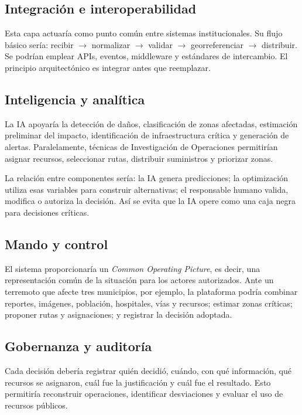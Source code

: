 \documentclass[11pt,a4paper]{article}
\begin{document}
\subsection{Integración e interoperabilidad}

Esta capa actuaría como punto común entre sistemas institucionales. Su flujo
básico sería: recibir $\rightarrow$ normalizar $\rightarrow$ validar
$\rightarrow$ georreferenciar $\rightarrow$ distribuir. Se podrían emplear
APIs, eventos, middleware y estándares de intercambio. El principio
arquitectónico es integrar antes que reemplazar.

\subsection{Inteligencia y analítica}

La IA apoyaría la detección de daños, clasificación de zonas afectadas,
estimación preliminar del impacto, identificación de infraestructura crítica y
generación de alertas. Paralelamente, técnicas de Investigación de Operaciones
permitirían asignar recursos, seleccionar rutas, distribuir suministros y
priorizar zonas.

La relación entre componentes sería: la IA genera predicciones; la
optimización utiliza esas variables para construir alternativas; el
responsable humano valida, modifica o autoriza la decisión. Así se evita que
la IA opere como una caja negra para decisiones críticas.

\subsection{Mando y control}

El sistema proporcionaría un \emph{Common Operating Picture}, es decir, una
representación común de la situación para los actores autorizados. Ante un
terremoto que afecte tres municipios, por ejemplo, la plataforma podría
combinar reportes, imágenes, población, hospitales, vías y recursos; estimar
zonas críticas; proponer rutas y asignaciones; y registrar la decisión
adoptada.

\subsection{Gobernanza y auditoría}

Cada decisión debería registrar quién decidió, cuándo, con qué información,
qué recursos se asignaron, cuál fue la justificación y cuál fue el resultado.
Esto permitiría reconstruir operaciones, identificar desviaciones y evaluar el
uso de recursos públicos.
\end{document}
